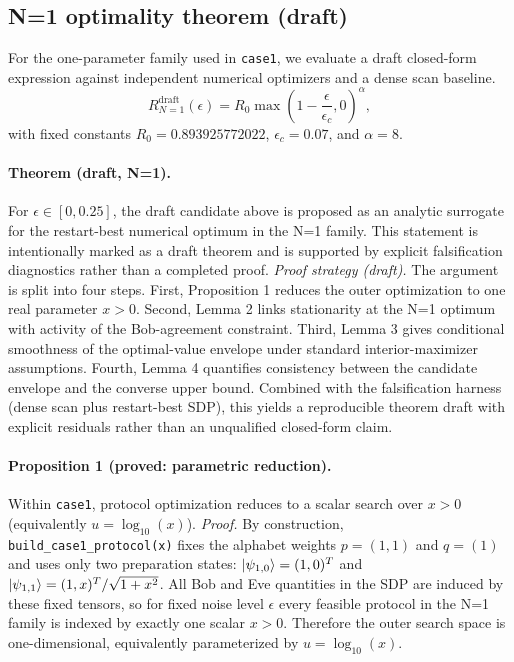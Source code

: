 \documentclass[a4paper,twocolumn,11pt,unpublished]{quantumarticle}
\begin{document}
\subsection{N=1 optimality theorem (draft)}
For the one-parameter family used in \texttt{case1}, we evaluate a draft
closed-form expression against independent numerical optimizers and a dense
scan baseline.
\begin{equation}
R_{N=1}^{\mathrm{draft}}(\epsilon) =
R_0\max\left(1-\frac{\epsilon}{\epsilon_c},0\right)^\alpha,
\end{equation}
with fixed constants
$R_0=0.893925772022$, $\epsilon_c=0.07$, and $\alpha=8$.

\paragraph{Theorem (draft, N=1).}
For $\epsilon \in [0,0.25]$, the draft candidate above is proposed as an
analytic surrogate for the restart-best numerical optimum in the N=1 family.
This statement is intentionally marked as a draft theorem and is supported by
explicit falsification diagnostics rather than a completed proof.
{\color{magenta}
\textit{Proof strategy (draft).}
The argument is split into four steps. First, Proposition 1 reduces the outer
optimization to one real parameter $x>0$. Second, Lemma 2 links stationarity at
the N=1 optimum with activity of the Bob-agreement constraint. Third, Lemma 3
gives conditional smoothness of the optimal-value envelope under standard
interior-maximizer assumptions. Fourth, Lemma 4 quantifies consistency between
the candidate envelope and the converse upper bound. Combined with the
falsification harness (dense scan plus restart-best SDP), this yields a
reproducible theorem draft with explicit residuals rather than an unqualified
closed-form claim.
}

\paragraph{Proposition 1 (proved: parametric reduction).}
Within \texttt{case1}, protocol optimization reduces to a scalar search over
$x>0$ (equivalently $u=\log_{10}(x)$).
{\color{magenta}
\textit{Proof.}
By construction, \texttt{build\_case1\_protocol(x)} fixes the alphabet weights
$p=(1,1)$ and $q=(1)$ and uses only two preparation states:
$\ket{\psi_{1,0}}=(1,0)^T$ and
$\ket{\psi_{1,1}}=(1,x)^T/\sqrt{1+x^2}$.
All Bob and Eve quantities in the SDP are induced by these fixed tensors, so
for fixed noise level $\epsilon$ every feasible protocol in the N=1 family is
indexed by exactly one scalar $x>0$. Therefore the outer search space is
one-dimensional, equivalently parameterized by $u=\log_{10}(x)$.
}
\end{document}
